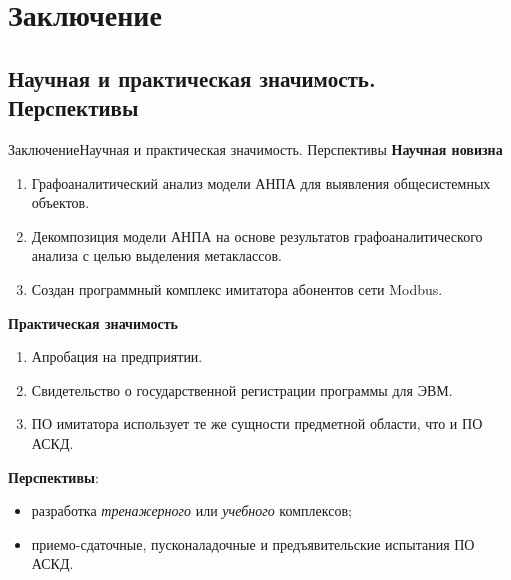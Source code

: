 \section{Заключение}\subsection{Научная и практическая значимость. Перспективы}
\begin{frame}{Заключение}{Научная и практическая значимость. Перспективы}
    \textbf{Научная новизна}
    \begin{enumerate}
        \item Графоаналитический анализ модели АНПА для выявления общесистемных объектов.
        \item Декомпозиция модели АНПА на основе результатов графоаналитического анализа с целью выделения метаклассов.
        \item Создан программный комплекс имитатора абонентов сети Modbus.
    \end{enumerate}
    
    \textbf{Практическая значимость}
    \begin{enumerate}
        \item Апробация \leadingOrganizationTitle на предприятии.
        \item Свидетельство о государственной регистрации программы для ЭВМ.
        \item ПО имитатора использует те же сущности предметной области, что и ПО АСКД.
      \end{enumerate}
      
      \textbf{Перспективы}: 
      \begin{itemize}
        \item разработка \textit{тренажерного} или \textit{учебного} комплексов;
        \item приемо-сдаточные, пусконаладочные и предъявительские испытания ПО АСКД.
      \end{itemize}
\end{frame}


